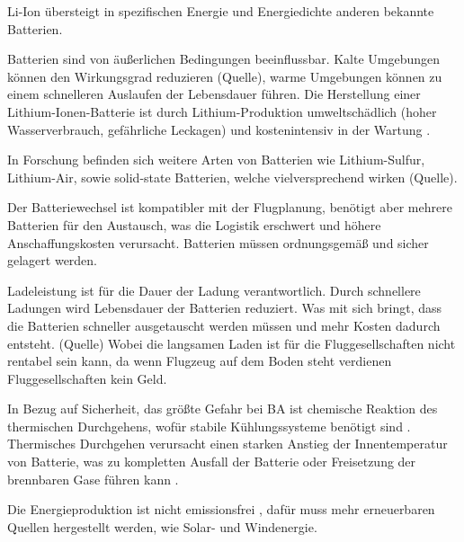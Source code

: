 Li-Ion übersteigt in spezifischen Energie und Energiedichte anderen bekannte Batterien.%

Batterien sind von äußerlichen Bedingungen beeinflussbar. Kalte Umgebungen können 
den Wirkungsgrad reduzieren (Quelle), warme Umgebungen können zu einem schnelleren Auslaufen der Lebensdauer führen. 
Die Herstellung einer Lithium-Ionen-Batterie ist durch Lithium-Produktion umweltschädlich (hoher Wasserverbrauch, gefährliche Leckagen) und 
kostenintensiv in der Wartung \cite{dalmia2022powering}. 

In Forschung befinden sich weitere Arten von Batterien wie Lithium-Sulfur, Lithium-Air, sowie solid-state Batterien, welche vielversprechend wirken (Quelle).
%
%

Der Batteriewechsel ist kompatibler mit der Flugplanung, benötigt aber mehrere Batterien für den Austausch, was die Logistik erschwert 
und höhere Anschaffungskosten verursacht. Batterien müssen ordnungsgemäß und sicher gelagert werden. \cite{salucci2020optimal}


Ladeleistung ist für die Dauer der Ladung verantwortlich. Durch schnellere Ladungen wird Lebensdauer der Batterien reduziert. 
Was mit sich bringt, dass die Batterien schneller ausgetauscht werden müssen
und mehr Kosten dadurch entsteht. (Quelle) Wobei die langsamen Laden ist für die Fluggesellschaften nicht rentabel sein kann, 
da wenn Flugzeug auf dem Boden steht verdienen Fluggesellschaften kein Geld.

In Bezug auf Sicherheit, das größte Gefahr bei BA ist chemische Reaktion des thermischen Durchgehens, wofür stabile
Kühlungssysteme benötigt sind \cite{donckers2024electric}. Thermisches Durchgehen verursacht einen starken Anstieg der 
Innentemperatur von Batterie, was zu kompletten Ausfall der Batterie oder Freisetzung der brennbaren Gase führen kann \cite{shahid2022review}.


Die Energieproduktion ist nicht emissionsfrei \cite{abrantes2024impact}, dafür muss mehr erneuerbaren Quellen hergestellt werden, 
wie Solar- und Windenergie. 


